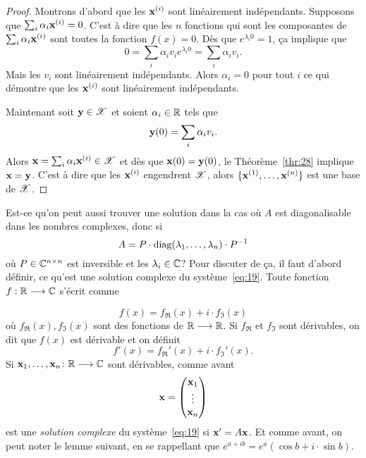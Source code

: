 \begin{proof}
  Montrons d'abord que les $\mathbf{x}^{(i)}$ sont linéairement indépendants. Supposons que $\sum_{i} \alpha_i \mathbf{x}^{(i)} = 0$. C'est à dire que les $n$ fonctions qui sont les composantes de $\sum_{i} \alpha_i \mathbf{x}^{(i)}$ sont toutes la fonction $f(x) = 0$. Dès que $e^{\lambda_i 0} = 1$, ça implique que 
  \begin{displaymath}
    0 = \sum_i \alpha_i v_i e^{\lambda_i 0} = \sum_i \alpha_i v_i.  
  \end{displaymath}
Mais les $v_i$ sont linéairement indépendants. Alors $\alpha_i = 0$ pour tout $i$ ce qui démontre que les $\mathbf{x}^{(i)}$ sont linéairement indépendants. 


Maintenant soit $\mathbf{y} \in \mathscr{X}$ et soient  $\alpha_i \in \mathbb{R}$  tels que 
\begin{displaymath}
  \mathbf{y}(0) = \sum_i \alpha_i v_i.  
\end{displaymath}
Alors $\mathbf{x} = \sum_i \alpha_i \mathbf{x}^{(i)} \in \mathscr{X}$  et dès que $\mathbf{x}(0) = \mathbf{y}(0)$, le Théorème~\ref{thr:28} implique $\mathbf{x} = \mathbf{y}$. C'est à dire que les $\mathbf{x}^{(i)}$ engendrent $\mathscr{X}$, alors $\{\mathbf{x}^{(1)},\dots, \mathbf{x}^{(n)}\}$ est une base de $\mathscr{X}$. 
\end{proof}


Est-ce qu'on peut aussi trouver une solution dans la cas où $A$ est diagonalisable dans les nombres complexes, donc si 
\begin{displaymath}
A=P \cdot \operatorname{diag}(\lambda_1,\dots,\lambda_n) \cdot P^{-1} 
\end{displaymath}
où $P \in \mathbb{C}^{n \times n}$ est inversible et les  $\lambda_i \in \mathbb{C}$? Pour discuter de ça, il faut d'abord définir, ce qu'est une solution complexe du système~\eqref{eq:19}. Toute fonction $f: \mathbb{R} \longrightarrow \mathbb{C}$ s'écrit comme 

\begin{displaymath}
  f(x) = f_{\Re}(x) + i \cdot f_{\Im}(x) 
\end{displaymath}
où $f_{\Re}(x), f_{\Im}(x)$ sont des fonctions de $ \mathbb{R} \longrightarrow \mathbb{R}$.  Si $f_\Re$ et $f_\Im$ sont dérivables, on dit que $f(x)$ est dérivable et on définit 
\begin{displaymath}
  f'(x) = f_\Re'(x) + i \cdot f_\Im'(x). 
\end{displaymath}
Si $\mathbf{x}_1,\dots,\mathbf{x}_n\colon \mathbb{R} \longrightarrow \mathbb{C}$ sont dérivables, comme avant 
\begin{displaymath}
  \mathbf{x} =
  \begin{pmatrix}
    \mathbf{x}_1\\ \vdots \\ \mathbf{x}_n
  \end{pmatrix}
\end{displaymath}
est une \emph{solution complexe} du système~\eqref{eq:19} si $\mathbf{x}' = A\mathbf{x}$.   Et comme avant, on peut noter le lemme suivant, en se rappellant que $e^{a + ib} = e^a (\cos b + i \cdot \sin b)$. 



